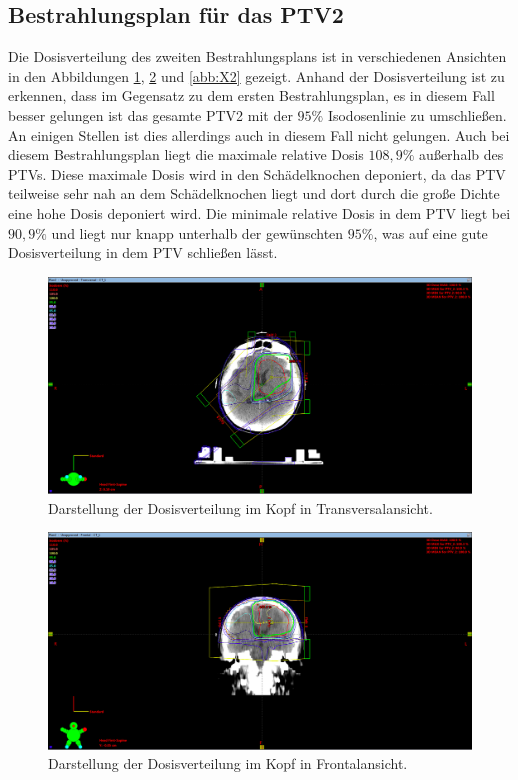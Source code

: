 \subsection*{Bestrahlungsplan für das PTV2}

Die Dosisverteilung des zweiten Bestrahlungsplans ist in verschiedenen Ansichten in den
Abbildungen \ref{abb:Z2}, \ref{abb:Y2} und \ref{abb:X2} gezeigt. Anhand der Dosisverteilung ist
zu erkennen, dass im Gegensatz zu dem ersten Bestrahlungsplan, es in diesem Fall besser gelungen
ist das gesamte PTV2 mit der $95\%$ Isodosenlinie zu umschließen. An einigen Stellen ist dies allerdings auch in
diesem Fall nicht gelungen. Auch bei diesem Bestrahlungsplan liegt die maximale relative Dosis $108,9\%$ außerhalb des
PTVs. Diese maximale Dosis wird in den Schädelknochen deponiert, da das PTV teilweise sehr nah an dem Schädelknochen liegt und dort durch die
große Dichte eine hohe Dosis deponiert wird. Die minimale relative Dosis in dem PTV liegt bei $90,9\%$ und liegt nur knapp unterhalb der gewünschten
$95\%$, was auf eine gute Dosisverteilung in dem PTV schließen lässt.


\begin{figure}[H]
  \centering
  \includegraphics[width=\textwidth]{Bilder/Teilhirn2_Z.png}
  \caption{Darstellung der Dosisverteilung im Kopf in Transversalansicht.}
  \label{abb:Z2}
\end{figure}

\begin{figure}[H]
  \centering
  \includegraphics[width=\textwidth]{Bilder/Teilhirn2_Y.png}
  \caption{Darstellung der Dosisverteilung im Kopf in Frontalansicht.}
  \label{abb:Y2}
\end{figure}

